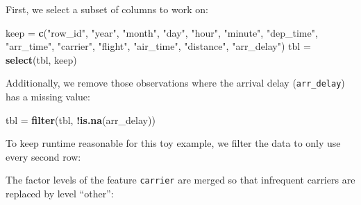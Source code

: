 \documentclass[]{article}
\newenvironment{Shaded}{\begin{snugshade}}{\end{snugshade}}
\newcommand{\DataTypeTok}[1]{\textcolor[rgb]{0.13,0.29,0.53}{#1}}
\newcommand{\DecValTok}[1]{\textcolor[rgb]{0.00,0.00,0.81}{#1}}
\newcommand{\KeywordTok}[1]{\textcolor[rgb]{0.13,0.29,0.53}{\textbf{#1}}}
\newcommand{\NormalTok}[1]{#1}
\newcommand{\OperatorTok}[1]{\textcolor[rgb]{0.81,0.36,0.00}{\textbf{#1}}}
\newcommand{\OtherTok}[1]{\textcolor[rgb]{0.56,0.35,0.01}{#1}}
\newcommand{\StringTok}[1]{\textcolor[rgb]{0.31,0.60,0.02}{#1}}
\renewenvironment{Shaded} {\begin{snugshade}\small} {\end{snugshade}}
\begin{document}
First, we select a subset of columns to work on:

\begin{Shaded}
\begin{Highlighting}[]
\NormalTok{keep =}\StringTok{ }\KeywordTok{c}\NormalTok{(}\StringTok{"row_id"}\NormalTok{, }\StringTok{"year"}\NormalTok{, }\StringTok{"month"}\NormalTok{, }\StringTok{"day"}\NormalTok{, }\StringTok{"hour"}\NormalTok{, }\StringTok{"minute"}\NormalTok{, }\StringTok{"dep_time"}\NormalTok{,}
  \StringTok{"arr_time"}\NormalTok{, }\StringTok{"carrier"}\NormalTok{, }\StringTok{"flight"}\NormalTok{, }\StringTok{"air_time"}\NormalTok{, }\StringTok{"distance"}\NormalTok{, }\StringTok{"arr_delay"}\NormalTok{)}
\NormalTok{tbl =}\StringTok{ }\KeywordTok{select}\NormalTok{(tbl, keep)}
\end{Highlighting}
\end{Shaded}

Additionally, we remove those observations where the arrival delay (\texttt{arr\_delay}) has a missing value:

\begin{Shaded}
\begin{Highlighting}[]
\NormalTok{tbl =}\StringTok{ }\KeywordTok{filter}\NormalTok{(tbl, }\OperatorTok{!}\KeywordTok{is.na}\NormalTok{(arr_delay))}
\end{Highlighting}
\end{Shaded}

To keep runtime reasonable for this toy example, we filter the data to only use every second row:

\begin{Shaded}
\end{Shaded}

The factor levels of the feature \texttt{carrier} are merged so that infrequent carriers are replaced by level ``other'':

\begin{Shaded}
\end{Shaded}
\end{document}
